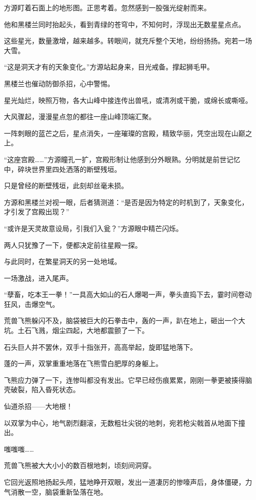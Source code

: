 \begin{this_body}
方源盯着石面上的地形图。正思考着。忽然感到一股强光绽射而来。

他和黑楼兰同时抬起头，看到青绿的苍穹中，不知何时，浮现出无数星星点点。

这些星光，数量激增，越来越多。转眼间，就充斥整个天地，纷纷扬扬。宛若一场大雪。

“这是洞天才有的天象变化。”方源站起身来，目光戒备。撑起狮毛甲。

黑楼兰也催动防御杀招，心中警惕。

星光灿烂，映照万物，各大山峰中接连传出兽吼，或清冽或干脆，或绵长或嘶哑。

大风骤起，漫漫星点忽的都往一座山峰顶端汇聚。

一阵刺眼的蓝芒之后，星点消失，一座璀璨的宫殿，精致华丽，凭空出现在山巅之上。

“这座宫殿……”方源瞳孔一扩，宫殿形制让他感到分外眼熟。分明就是前世记忆中，碎块世界里四处洒落的断壁残垣。

只是曾经的断壁残垣，此刻却丝毫未损。

方源和黑楼兰对视一眼，后者猜测道：“是否是因为特定的时机到了，天象变化，才引发了宫殿出现？”

“或许是天灵故意设局，引我们入瓮？”方源眼中精芒闪烁。

两人只犹豫了一下，便都决定前往星殿一探。

与此同时，在繁星洞天的另一处地域。

一场激战，进入尾声。

“孽畜，吃本王一拳！”一具高大如山的石人爆喝一声，拳头直捣下去，霎时间卷动狂风，击爆空气。

荒兽飞熊躲闪不及，脑袋被巨大的石拳击中，轰的一声，趴在地上，砸出一个大坑。土石飞溅，烟尘四起，大地都震颤了一下。

石头巨人并不罢休，双手十指张开，高高举起，旋即猛地落下。

蓬的一声，双掌重重地落在飞熊雪白肥厚的身躯上。

飞熊应力弹了一下，连惨叫都没有发出。它早已经伤痕累累，刚刚一拳更被揍得脑壳破裂，陷入昏死状态。

仙道杀招——大地根！

以双掌为中心，地气剧烈翻滚，无数粗壮尖锐的地刺，宛若枪尖戟首从地面下撞出。

嗤嗤嗤……

荒兽飞熊被大大小小的数百根地刺，顷刻间洞穿。

它回光返照地扬起头颅，猛地睁开双眼，发出一道凄厉的惨嚎声后，身体僵硬，力气消散一空，脑袋重新坠落在地。


\end{this_body}

